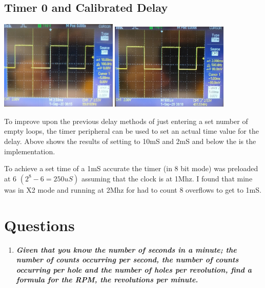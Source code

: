 \documentclass[11pt]{article}
\begin{document}
\begin{preview}
        

        \subsection{Timer 0 and Calibrated Delay}
        \begin{center}
            \includegraphics[width=0.42\textwidth]{inc/timer_10ms.jpg}
            \includegraphics[width=0.42\textwidth]{inc/timer_2ms.jpg}
        \end{center}

        To improve upon the previous delay methods of just entering a set number of empty loops, the timer peripheral can be used to set an actual time value for the delay. Above shows the results of setting to 10mS and 2mS and below the is the implementation.

        To achieve a set time of a 1mS accurate the timer (in 8 bit mode) was preloaded at 6 $(2^8 - 6 = 250uS)$ assuming that the clock is at 1Mhz. I found that mine was in X2 mode and running at 2Mhz for had to count 8 overflows to get to 1mS.

        
\section{Questions}
\begin{enumerate}
    \item \textit{\textbf{Given that you know the number of seconds in a minute; the number of counts occurring per second, the number of counts occurring per hole and the number of holes per revolution, find a formula for the RPM, the revolutions per minute.}}\\
    

\end{enumerate}
\end{preview}
\end{document}

